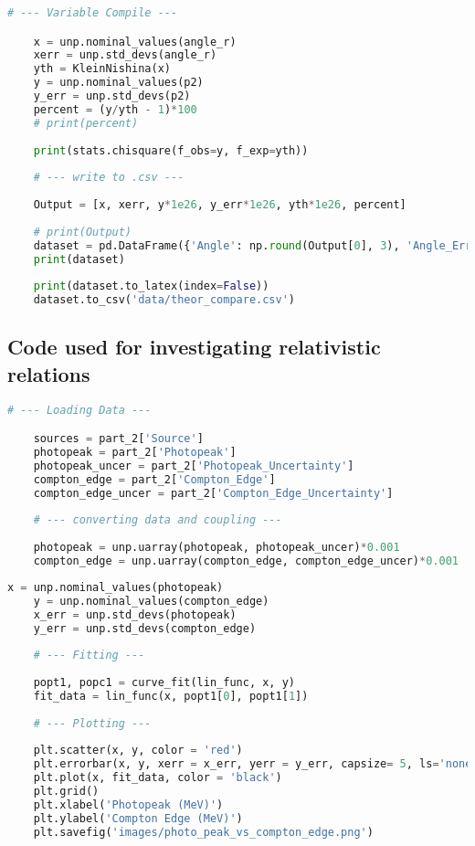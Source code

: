 \begin{lstlisting}[language = Python, frame = single]
    # --- Variable Compile --- 

    x = unp.nominal_values(angle_r)
    xerr = unp.std_devs(angle_r)
    yth = KleinNishina(x)
    y = unp.nominal_values(p2)
    y_err = unp.std_devs(p2)
    percent = (y/yth - 1)*100
    # print(percent)
    
    print(stats.chisquare(f_obs=y, f_exp=yth))
    
    # --- write to .csv --- 
    
    Output = [x, xerr, y*1e26, y_err*1e26, yth*1e26, percent]
    
    # print(Output)
    dataset = pd.DataFrame({'Angle': np.round(Output[0], 3), 'Angle_Error': np.round(Output[1], 3), 'Diff_Cross_Section': np.round(Output[2], 3), 'Diff_Cross_Section_Uncer': np.round(Output[3], 3), 'Diff_Cross_Section_Th': np.round(Output[4], 3), 'Percent': np.round(Output[5], 1)})
    print(dataset)
    
    print(dataset.to_latex(index=False)) 
    dataset.to_csv('data/theor_compare.csv')
\end{lstlisting}

\newpage
\subsection{Code used for investigating relativistic relations} \label{code_p2}

\begin{lstlisting}[language = Python, frame = single]
    # --- Loading Data --- 

    sources = part_2['Source']
    photopeak = part_2['Photopeak']
    photopeak_uncer = part_2['Photopeak_Uncertainty']
    compton_edge = part_2['Compton_Edge']
    compton_edge_uncer = part_2['Compton_Edge_Uncertainty']
    
    # --- converting data and coupling --- 
    
    photopeak = unp.uarray(photopeak, photopeak_uncer)*0.001 
    compton_edge = unp.uarray(compton_edge, compton_edge_uncer)*0.001  
\end{lstlisting}

\begin{lstlisting}[language = Python, frame = single]
    x = unp.nominal_values(photopeak)
    y = unp.nominal_values(compton_edge)
    x_err = unp.std_devs(photopeak)
    y_err = unp.std_devs(compton_edge)
    
    # --- Fitting --- 
    
    popt1, popc1 = curve_fit(lin_func, x, y)
    fit_data = lin_func(x, popt1[0], popt1[1])
    
    # --- Plotting ---
    
    plt.scatter(x, y, color = 'red')
    plt.errorbar(x, y, xerr = x_err, yerr = y_err, capsize= 5, ls='none', color = 'red')
    plt.plot(x, fit_data, color = 'black')
    plt.grid()
    plt.xlabel('Photopeak (MeV)') 
    plt.ylabel('Compton Edge (MeV)') 
    plt.savefig('images/photo_peak_vs_compton_edge.png')
\end{lstlisting}

